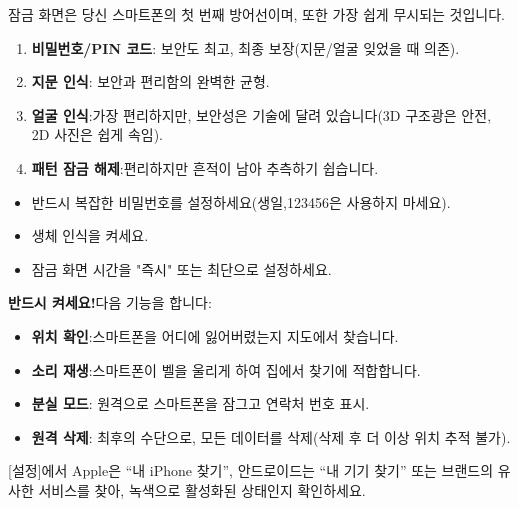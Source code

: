 


잠금 화면은 당신 스마트폰의 첫 번째 방어선이며, 또한 가장 쉽게 무시되는 것입니다.


\begin{enumerate}
  \item \textbf{비밀번호/PIN 코드}: 보안도 최고, 최종 보장(지문/얼굴 잊었을 때 의존).
  \item \textbf{지문 인식}: 보안과 편리함의 완벽한 균형.
  \item \textbf{얼굴 인식}:가장 편리하지만, 보안성은 기술에 달려 있습니다(3D 구조광은 안전, 2D 사진은 쉽게 속임).
  \item \textbf{패턴 잠금 해제}:편리하지만 흔적이 남아 추측하기 쉽습니다.
\end{enumerate}


\begin{itemize}
  \item 반드시 복잡한 비밀번호를 설정하세요(생일,123456은 사용하지 마세요).
  \item 생체 인식을 켜세요.
  \item 잠금 화면 시간을 "즉시" 또는 최단으로 설정하세요.
\end{itemize}


\textbf{반드시 켜세요!}다음 기능을 합니다:

\begin{itemize}
  \item \textbf{위치 확인}:스마트폰을 어디에 잃어버렸는지 지도에서 찾습니다.
  \item \textbf{소리 재생}:스마트폰이 벨을 울리게 하여 집에서 찾기에 적합합니다.
  \item \textbf{분실 모드}: 원격으로 스마트폰을 잠그고 연락처 번호 표시.
  \item \textbf{원격 삭제}: 최후의 수단으로, 모든 데이터를 삭제(삭제 후 더 이상 위치 추적 불가).
\end{itemize}

[설정]에서 Apple은 “내 iPhone 찾기”, 안드로이드는 “내 기기 찾기” 또는 브랜드의 유사한 서비스를 찾아, 녹색으로 활성화된 상태인지 확인하세요.


